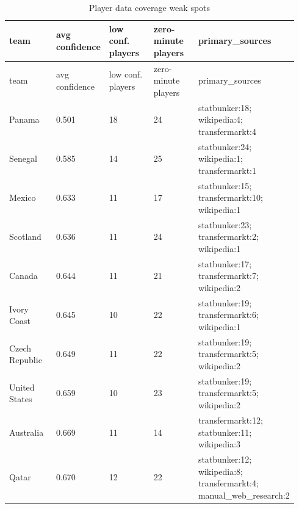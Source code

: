 \documentclass[10pt]{article}
\begin{document}
\begin{longtable}{p{0.188\linewidth}p{0.188\linewidth}p{0.188\linewidth}p{0.188\linewidth}p{0.188\linewidth}}
\caption{Player data coverage weak spots}\\
\toprule
team & avg confidence & low conf. players & zero-minute players & primary\_sources \\
\midrule
\endfirsthead
\toprule
team & avg confidence & low conf. players & zero-minute players & primary\_sources \\
\midrule
\endhead
Panama & 0.501 & 18 & 24 & statbunker:18; wikipedia:4; transfermarkt:4 \\
Senegal & 0.585 & 14 & 25 & statbunker:24; wikipedia:1; transfermarkt:1 \\
Mexico & 0.633 & 11 & 17 & statbunker:15; transfermarkt:10; wikipedia:1 \\
Scotland & 0.636 & 11 & 24 & statbunker:23; transfermarkt:2; wikipedia:1 \\
Canada & 0.644 & 11 & 21 & statbunker:17; transfermarkt:7; wikipedia:2 \\
Ivory Coast & 0.645 & 10 & 22 & statbunker:19; transfermarkt:6; wikipedia:1 \\
Czech Republic & 0.649 & 11 & 22 & statbunker:19; transfermarkt:5; wikipedia:2 \\
United States & 0.659 & 10 & 23 & statbunker:19; transfermarkt:5; wikipedia:2 \\
Australia & 0.669 & 11 & 14 & transfermarkt:12; statbunker:11; wikipedia:3 \\
Qatar & 0.670 & 12 & 22 & statbunker:12; wikipedia:8; transfermarkt:4; manual\_web\_research:2 \\
\bottomrule
\end{longtable}
\end{document}
